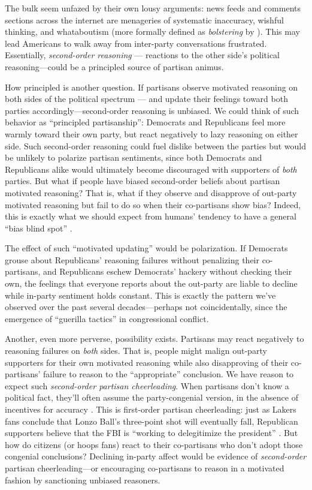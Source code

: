 \documentclass[12pt, letterpaper]{article}
\begin{document}
 The bulk seem unfazed by their own lousy arguments: news feeds and comments sections across the internet are menageries of systematic inaccuracy, wishful thinking, and whataboutism (more formally defined as \emph{bolstering} by \citeauthor{abelson1959modes} \citeyear{abelson1959modes}). This may lead Americans to walk away from inter-party conversations frustrated. Essentially, \emph{second-order reasoning} --- reactions to the other side's political reasoning---could be a principled source of partisan animus. 

How principled is another question. If partisans observe motivated reasoning on both sides of the political spectrum --- and update their feelings toward both parties accordingly---second-order reasoning is unbiased. We could think of such behavior as ``principled partisanship'': Democrats and Republicans feel more warmly toward their own party, but react negatively to lazy reasoning on either side. Such second-order reasoning could fuel dislike between the parties but would be unlikely to polarize partisan sentiments, since both Democrats and Republicans alike would ultimately become discouraged with supporters of \emph{both} parties. But what if people have biased second-order beliefs about partisan motivated reasoning? That is, what if they observe and disapprove of out-party motivated reasoning but fail to do so when their co-partisans show bias? Indeed, this is exactly what we should expect from humans' tendency to have a general ``bias blind spot'' \citep{proninetal_2002,pronin_2007}.

The effect of such ``motivated updating'' would be polarization. If Democrats grouse about Republicans' reasoning failures without penalizing their co-partisans, and Republicans eschew Democrats' hackery without checking their own, the feelings that everyone reports about the out-party are liable to decline while in-party sentiment holds constant. This is exactly the pattern we've observed over the past several decades---perhaps not coincidentally, since the emergence of ``guerilla tactics'' \citep{Schickler2001} in congressional conflict.

Another, even more perverse, possibility exists. Partisans may react negatively to reasoning failures on \emph{both} sides. That is, people might malign out-party supporters for their own motivated reasoning while also disapproving of their co-partisans' failure to reason to the ``appropriate'' conclusion. We have reason to expect such \emph{second-order partisan cheerleading}. When partisans don't know a political fact, they'll often assume the party-congenial version, in the absence of incentives for accuracy \citep{bullocketal_2015}. This is first-order partisan cheerleading: just as Lakers fans conclude that Lonzo Ball's three-point shot will eventually fall, Republican supporters believe that the FBI is ``working to delegitimize the president'' \citep{kahn2018most}. But how do citizens (or hoops fans) react to their co-partisans who don't adopt those congenial conclusions? Declining in-party affect would be evidence of \emph{second-order} partisan cheerleading---or encouraging co-partisans to reason in a motivated fashion by sanctioning unbiased reasoners. 
\end{document}
